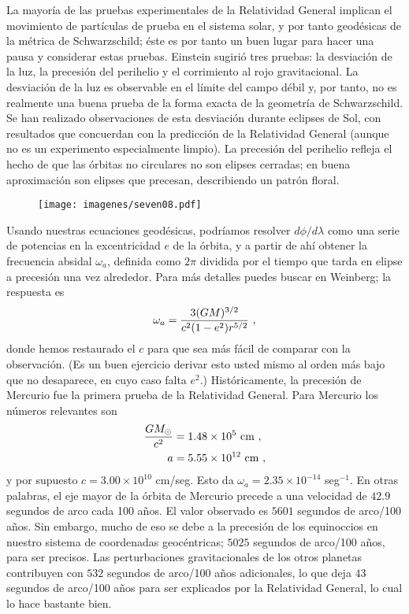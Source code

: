 \documentclass[11pt,b5paper,openany,twoside]{book}
\begin{document}
La mayoría de las pruebas experimentales de la Relatividad General implican el movimiento de partículas de prueba en el sistema solar, y por tanto geodésicas de la métrica de Schwarzschild; éste es por tanto un buen lugar para hacer una pausa y considerar estas pruebas.
Einstein sugirió tres pruebas: la desviación de la luz, la precesión del perihelio y el corrimiento al rojo gravitacional.
La desviación de la luz es observable en el límite del campo débil y, por tanto, no es realmente una buena prueba de la forma exacta de la geometría de Schwarzschild.
Se han realizado observaciones de esta desviación durante eclipses de Sol, con resultados que concuerdan con la predicción de la Relatividad General (aunque no es un experimento especialmente limpio).
La precesión del perihelio refleja el hecho de que las órbitas no circulares no son elipses cerradas; en buena aproximación son elipses que precesan, describiendo un patrón floral.

\begin{figure}[h]
\centering
\texttt{[image: imagenes/seven08.pdf]}
\end{figure}

Usando nuestras ecuaciones geodésicas, podríamos resolver $d\phi/d\lambda$ como una serie de potencias en la excentricidad $e$ de la órbita, y a partir de ahí obtener la frecuencia absidal $\omega_a$, definida como $2\pi$ dividida por el tiempo que tarda en elipse a precesión una vez alrededor.
Para más detalles puedes buscar en Weinberg; la respuesta es
\begin{equation}
\omega_a={{3(GM)^{3/2}}\over {c^2(1-e^2)r^{5/2}}}\ ,\label{7.56}
\end{equation}
donde hemos restaurado el $c$ para que sea más fácil de comparar con la observación.
(Es un buen ejercicio derivar esto usted mismo al orden más bajo que no desaparece, en cuyo caso falta $e^2$.)
Históricamente, la precesión de Mercurio fue la primera prueba de la Relatividad General.
Para Mercurio los números relevantes son
\begin{align}
{{GM_\odot}\over{c^2}} &=  1.48\times 10^5 {\rm ~cm}\ , \notag \\
a  &=  5.55\times 10^{12}{\rm ~cm}\ ,\label{7.57}
\end{align}
y por supuesto $c=3.00\times 10^{10}$ cm/seg.
Esto da $\omega_a = 2.35\times 10^{-14}$ seg$^{-1}$.
En otras palabras, el eje mayor de la órbita de Mercurio precede a una velocidad de $42.9$ segundos de arco cada 100 años.
El valor observado es $5601$ segundos de arco/100 años.
Sin embargo, mucho de eso se debe a la precesión de los equinoccios en nuestro sistema de coordenadas geocéntricas; $5025$ segundos de arco/100 años, para ser precisos.
Las perturbaciones gravitacionales de los otros planetas contribuyen con $532$ segundos de arco/100 años adicionales, lo que deja $43$ segundos de arco/100 años para ser explicados por la Relatividad General, lo cual lo hace bastante bien.
\end{document}
